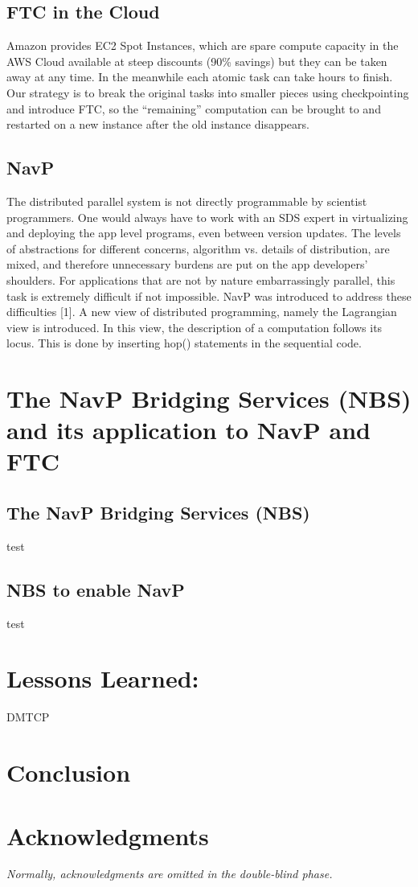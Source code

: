 \documentclass[conference]{IEEEtran}
\newcommand{\TODO}[1]{{\color{blue}\textit{#1}}}
\begin{document}
\subsection{FTC in the Cloud}
\label{subsec:s11}

Amazon provides EC2 Spot Instances, which are spare compute capacity in the AWS Cloud available at steep discounts (90\% savings) but they can be taken away at any time. In the meanwhile each atomic task can take hours to finish. Our strategy is to break the original tasks into smaller pieces using checkpointing and introduce FTC, so the ``remaining'' computation can be brought to and restarted on a new instance after the old instance disappears.

\subsection{NavP}
\label{subsec:s12}

The distributed parallel system is not directly programmable by scientist programmers. One would always have to work with an SDS expert in virtualizing and deploying the app level programs, even between version updates. The levels of abstractions for different concerns, algorithm vs. details of distribution, are mixed, and therefore unnecessary burdens are put on the app developers’ shoulders. For applications that are not by nature embarrassingly parallel, this task is extremely difficult if not impossible. NavP was introduced to address these difficulties [1]. A new view of distributed programming, namely the Lagrangian view is introduced. In this view, the description of a computation follows its locus. This is done by inserting  hop() statements in the sequential code.

\section{The NavP Bridging Services (NBS) and its application to NavP and FTC}
\label{sec:s2}
\cite{ansel2009dmtcp}

\subsection{The NavP Bridging Services (NBS)}
\label{subsec:s21}
test
\subsection{NBS to enable NavP}
\label{subsec:s22}
test
\section{Lessons Learned:  }
DMTCP\label{sec:lessons-learned}


\section{Conclusion}
\label{sec:conclusion}


\section*{Acknowledgments}
\TODO{Normally, acknowledgments are omitted in the double-blind phase.}



\end{document}
